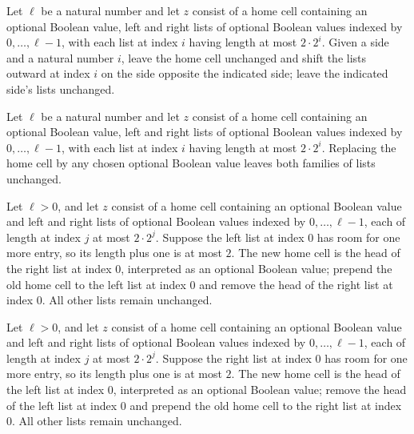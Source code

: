\begin{definition}
\label{Turing.zoneShiftOut}
\leanok
{}
Let $\ell$ be a natural number and let $z$ consist of a home cell containing an optional
Boolean value, left and right lists of optional Boolean values indexed by
$0,\ldots,\ell-1$, with each list at index $i$ having length at most $2\cdot 2^i$. Given
a side and a natural number $i$, leave the home cell unchanged and shift the lists
outward at index $i$ on the side opposite the indicated side; leave the indicated side’s
lists unchanged.
\end{definition}

\begin{definition}
\label{Turing.zoneHomeWrite}
\leanok
{}
Let $\ell$ be a natural number and let $z$ consist of a home cell containing an optional
Boolean value, left and right lists of optional Boolean values indexed by
$0,\ldots,\ell-1$, with each list at index $i$ having length at most $2\cdot 2^i$.
Replacing the home cell by any chosen optional Boolean value leaves both families of
lists unchanged.
\end{definition}

\begin{definition}
\label{Turing.zoneMoveRight}
\leanok
{}
Let $\ell>0$, and let $z$ consist of a home cell containing an optional Boolean value
and left and right lists of optional Boolean values indexed by $0,\ldots,\ell-1$, each
of length at index $j$ at most $2\cdot 2^j$. Suppose the left list at index $0$ has room
for one more entry, so its length plus one is at most $2$. The new home cell is the head
of the right list at index $0$, interpreted as an optional Boolean value; prepend the
old home cell to the left list at index $0$ and remove the head of the right list at
index $0$. All other lists remain unchanged.
\end{definition}

\begin{definition}
\label{Turing.zoneMoveLeft}
\leanok
{}
Let $\ell>0$, and let $z$ consist of a home cell containing an optional Boolean value
and left and right lists of optional Boolean values indexed by $0,\ldots,\ell-1$, each
of length at index $j$ at most $2\cdot 2^j$. Suppose the right list at index $0$ has
room for one more entry, so its length plus one is at most $2$. The new home cell is the
head of the left list at index $0$, interpreted as an optional Boolean value; remove the
head of the left list at index $0$ and prepend the old home cell to the right list at
index $0$. All other lists remain unchanged.
\end{definition}

